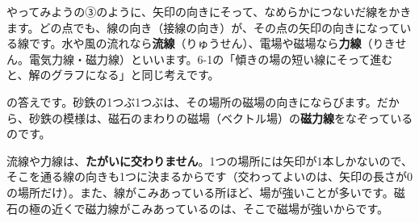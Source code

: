 
\leavevmode\label{bk:8-5:ryusen}やってみようの③のように、矢印の向きにそって、なめらかにつないだ線をかきます。どの点でも、線の向き（接線の向き）が、その点の矢印の向きになっている線です。水や風の流れなら\textbf{流線}（りゅうせん）、電場や磁場なら\textbf{力線}（りきせん。電気力線・磁力線）といいます。6-1の「傾きの場の短い線にそって進むと、解のグラフになる」と同じ考えです。

\noindent \bkhatenaref の答えです。砂鉄の1つぶ1つぶは、その場所の磁場の向きにならびます。だから、砂鉄の模様は、磁石のまわりの磁場（ベクトル場）の\textbf{磁力線}をなぞっているのです。
\begin{bkfigure}
\label{bk:8-5:fig-jiryoku}
\end{bkfigure}
流線や力線は、\textbf{たがいに交わりません}。1つの場所には矢印が1本しかないので、そこを通る線の向きも1つに決まるからです（交わってよいのは、矢印の長さが0の場所だけ）。また、線がこみあっている所ほど、場が強いことが多いです。磁石の極の近くで磁力線がこみあっているのは、そこで磁場が強いからです。

